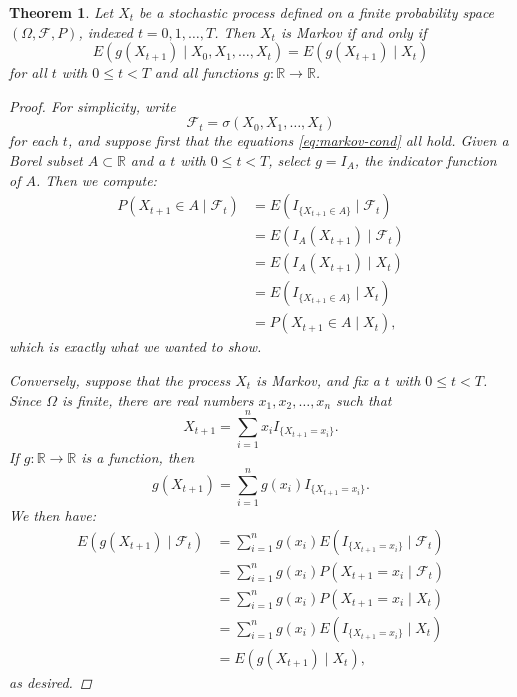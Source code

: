 \documentclass[reqno]{amsart}
\newtheorem{thm}{Theorem}[section]
\theoremstyle{definition}
\numberwithin{equation}{section}
\begin{document}
\begin{thm}
Let $X_t$ be a stochastic process defined on a finite probability space $(\Omega, \mathcal{F}, P)$, indexed $t=0,1,\ldots,T$. Then $X_t$ is Markov if and only if
	\begin{equation}\label{eq:markov-cond}
	E\left(g(X_{t+1}) \mid X_0, X_1,\ldots,X_t\right) = E \left( g(X_{t+1}) \mid X_t \right)
	\end{equation}
for all $t$ with $0\leq t < T$ and all functions $g: \mathbb{R} \to \mathbb{R}$.
\begin{proof}
For simplicity, write
	\[
	\mathcal{F}_t = \sigma\left(X_0,X_1,\ldots,X_t \right)
	\]
for each $t$, and suppose first that the equations \eqref{eq:markov-cond} all hold. Given a Borel subset $A\subset \mathbb{R}$ and a $t$ with $0\leq t < T$, select $g=I_A$, the indicator function of $A$. Then we compute:
	\begin{align*}
	P\left(X_{t+1} \in A \mid \mathcal{F}_t\right) &= E\left( I_{\{X_{t+1} \in A\}} \mid \mathcal{F}_t \right) \\
	&= E \left( I_A(X_{t+1}) \mid \mathcal{F}_t \right) \\
	&= E \left( I_A(X_{t+1}) \mid X_t \right) \\
	&= E \left( I_{\{X_{t+1} \in A\}} \mid X_t \right) \\
	&= P\left(X_{t+1} \in A \mid X_t\right),
	\end{align*}
which is exactly what we wanted to show.

Conversely, suppose that the process $X_t$ is Markov, and fix a $t$ with $0 \leq t < T$. Since $\Omega$ is finite, there are real numbers $x_1,x_2,\ldots,x_n$ such that
	\[
	X_{t+1} = \sum_{i=1}^n x_i I_{\{X_{t+1} = x_i \}}.
	\]
If $g: \mathbb{R} \to \mathbb{R}$ is a function, then
	\[
	g(X_{t+1}) = \sum_{i=1}^n g(x_i) I_{\{X_{t+1} = x_i \}}.
	\]
We then have:
	\begin{align*}
	E \left( g(X_{t+1}) \mid \mathcal{F}_t \right) &= \sum_{i=1}^n g(x_i) E\left(I_{\{X_{t+1} = x_i \}} \mid \mathcal{F}_t \right) \\
	&= \sum_{i=1}^n g(x_i) P\left(X_{t+1} = x_i \mid \mathcal{F}_t \right) \\
	&= \sum_{i=1}^n g(x_i) P\left(X_{t+1} = x_i \mid X_t \right) \\
	&= \sum_{i=1}^n g(x_i) E\left(I_{\{X_{t+1} = x_i \}} \mid X_t \right) \\
	&= E\left( g(X_{t+1}) \mid X_t \right),
	\end{align*}
as desired.
\end{proof}
\end{thm}
\end{document}
